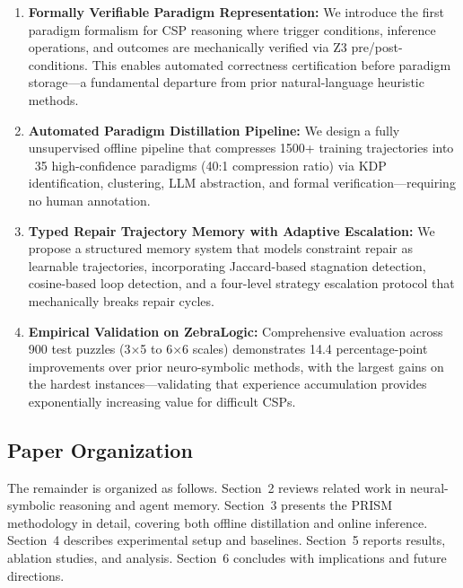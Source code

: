 \begin{enumerate}
    \item \textbf{Formally Verifiable Paradigm Representation:} We introduce the first paradigm formalism for CSP reasoning where trigger conditions, inference operations, and outcomes are mechanically verified via Z3 pre/post-conditions. This enables automated correctness certification before paradigm storage—a fundamental departure from prior natural-language heuristic methods.

    \item \textbf{Automated Paradigm Distillation Pipeline:} We design a fully unsupervised offline pipeline that compresses 1500+ training trajectories into ~35 high-confidence paradigms (40:1 compression ratio) via KDP identification, clustering, LLM abstraction, and formal verification—requiring no human annotation.

    \item \textbf{Typed Repair Trajectory Memory with Adaptive Escalation:} We propose a structured memory system that models constraint repair as learnable trajectories, incorporating Jaccard-based stagnation detection, cosine-based loop detection, and a four-level strategy escalation protocol that mechanically breaks repair cycles.

    \item \textbf{Empirical Validation on ZebraLogic:} Comprehensive evaluation across 900 test puzzles (3×5 to 6×6 scales) demonstrates 14.4 percentage-point improvements over prior neuro-symbolic methods, with the largest gains on the hardest instances—validating that experience accumulation provides exponentially increasing value for difficult CSPs.
\end{enumerate}

\subsection{Paper Organization}

The remainder is organized as follows. Section~2 reviews related work in neural-symbolic reasoning and agent memory. Section~3 presents the PRISM methodology in detail, covering both offline distillation and online inference. Section~4 describes experimental setup and baselines. Section~5 reports results, ablation studies, and analysis. Section~6 concludes with implications and future directions.
